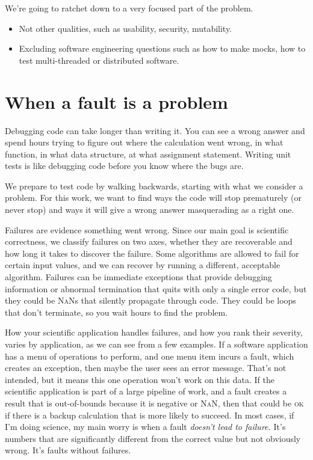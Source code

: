 \documentclass[fleqn,10pt]{olplainarticle}
\newcommand{\nan}{\textsc{NaN}\xspace}
\begin{document}
We're going to ratchet down to a very focused part of the problem.
\begin{itemize}
    \item Not other qualities, such as usability, security, mutability.
    \item Excluding software engineering questions such as how to make mocks, how to test multi-threaded or distributed software.
\end{itemize}


\section{When a fault is a problem}

Debugging code can take longer than writing it. You can see
a wrong answer and spend hours trying to figure out where the
calculation went wrong, in what function, in what data structure,
at what assignment statement.
Writing unit tests is like debugging code before you know
where the bugs are.

We prepare to test code by walking backwards, starting with
what we consider a problem. For this work, we want to find
ways the code will stop prematurely (or never stop)
and ways it will give a wrong answer masquerading as a right one.

Failures are evidence something went wrong. Since our main goal
is scientific correctness, we classify failures on two axes,
whether they are recoverable and how long it takes to discover
the failure. Some algorithms are allowed to fail for certain
input values, and we can recover by running a different, acceptable
algorithm. Failures can be immediate exceptions that provide
debugging information or abnormal termination that quits with
only a single error code, but they
could be \nan{}s that silently propagate through code. They
could be loops that don't terminate, so you wait hours to find
the problem.

How your scientific application handles failures, and how you
rank their severity, varies by application, as we can see from
a few examples. If a software application has a menu of operations
to perform, and one menu item incurs a fault, which creates an exception,
then maybe the user sees an error message. That's not intended, but
it means this one operation won't work on this data.
If the scientific application is part of a large pipeline of
work, and a fault creates a result that is out-of-bounds because
it is negative or \textsc{NaN}, then that could be \textsc{ok}
if there is a backup calculation that is more likely to succeed.
In most cases, if I'm doing science, my main worry is when a
fault \emph{doesn't lead to failure.} It's numbers that are
significantly different from the correct value but not obviously
wrong. It's faults without failures.
\end{document}
